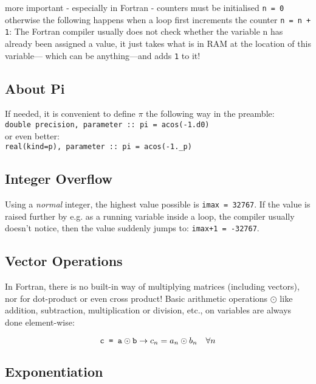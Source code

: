 \documentclass{article}
\begin{document}
more important - especially in Fortran - counters must be initialised \verb|n = 0| otherwise the following happens when a loop first increments the counter \verb|n = n + 1|: The Fortran compiler usually does not check whether the variable n has already been assigned a value, it just takes what is in RAM at the location of this variable--- which can be anything---and adds \verb|1| to it!


\subsection{About Pi}

If needed, it is convenient to define $\pi$ the following way in the preamble:\\

\noindent
\verb|double precision, parameter :: pi = acos(-1.d0)|\\

or even better:\\

\noindent
\verb|real(kind=p), parameter :: pi = acos(-1._p)|\\


\subsection{Integer Overflow}

Using a \emph{normal} integer, the highest value possible is
\verb|imax = 32767|. If the value is raised further by e.g. as a running variable inside a loop, the compiler usually doesn't notice, then the value suddenly jumps to: \verb|imax+1 = -32767|.


\subsection{Vector Operations}

In Fortran, there is no built-in way of multiplying matrices (including vectors), nor for dot-product or even cross product! Basic arithmetic operations $\odot$ like addition, subtraction, multiplication or division, etc., on variables are always done element-wise:

\[\verb|c = a| \odot \verb|b| \to c_n = a_n \odot b_n \quad \forall n\]


\subsection{Exponentiation}
\end{document}
